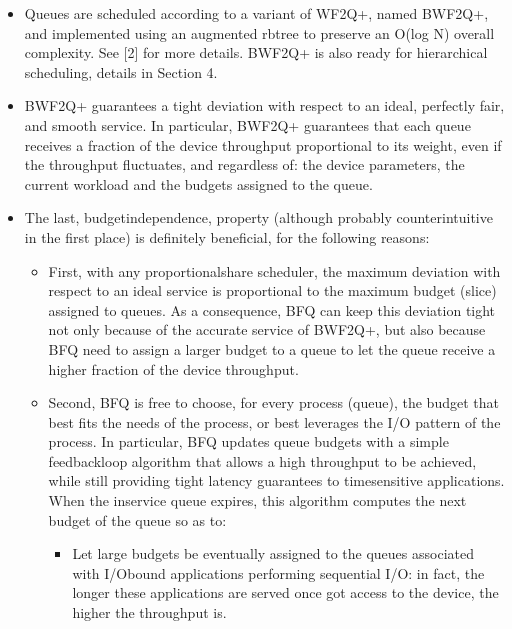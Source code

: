 \documentclass[a4paper,11pt,english]{sphinxmanual}
\begin{document}
\begin{itemize}
\begin{itemize}
\item {} 
Queues are scheduled according to a variant of WF2Q+, named
B\sphinxhyphen{}WF2Q+, and implemented using an augmented rb\sphinxhyphen{}tree to preserve an
O(log N) overall complexity.  See {[}2{]} for more details. B\sphinxhyphen{}WF2Q+ is
also ready for hierarchical scheduling, details in Section 4.

\item {} 
B\sphinxhyphen{}WF2Q+ guarantees a tight deviation with respect to an ideal,
perfectly fair, and smooth service. In particular, B\sphinxhyphen{}WF2Q+
guarantees that each queue receives a fraction of the device
throughput proportional to its weight, even if the throughput
fluctuates, and regardless of: the device parameters, the current
workload and the budgets assigned to the queue.

\item {} 
The last, budget\sphinxhyphen{}independence, property (although probably
counterintuitive in the first place) is definitely beneficial, for
the following reasons:
\begin{itemize}
\item {} 
First, with any proportional\sphinxhyphen{}share scheduler, the maximum
deviation with respect to an ideal service is proportional to
the maximum budget (slice) assigned to queues. As a consequence,
BFQ can keep this deviation tight not only because of the
accurate service of B\sphinxhyphen{}WF2Q+, but also because BFQ 
need to assign a larger budget to a queue to let the queue
receive a higher fraction of the device throughput.

\item {} 
Second, BFQ is free to choose, for every process (queue), the
budget that best fits the needs of the process, or best
leverages the I/O pattern of the process. In particular, BFQ
updates queue budgets with a simple feedback\sphinxhyphen{}loop algorithm that
allows a high throughput to be achieved, while still providing
tight latency guarantees to time\sphinxhyphen{}sensitive applications. When
the in\sphinxhyphen{}service queue expires, this algorithm computes the next
budget of the queue so as to:
\begin{itemize}
\item {} 
Let large budgets be eventually assigned to the queues
associated with I/O\sphinxhyphen{}bound applications performing sequential
I/O: in fact, the longer these applications are served once
got access to the device, the higher the throughput is.


\end{itemize}
\end{itemize}
\end{itemize}
\end{itemize}
\end{document}

